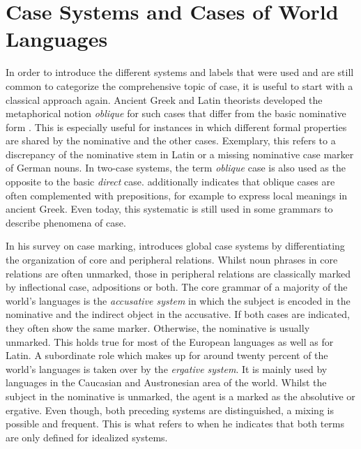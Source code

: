 \documentclass[11pt,a4paper,twoside,openright]{scrbook}
\begin{document}
\section{Case Systems and Cases of World Languages}

In order to introduce the different systems and labels that were used and are still common to categorize the comprehensive topic of case, it is useful to start with a classical approach again. Ancient Greek and Latin theorists developed the metaphorical notion \textit{oblique} for such cases that differ from the basic nominative form \citep{haspelmath2012hbocas}. This is especially useful for instances in which different formal properties are shared by the nominative and the other cases. Exemplary, this refers to a discrepancy of the nominative stem in Latin or a missing nominative case marker of German nouns. In two-case systems, the term \textit{oblique} case is also used as the opposite to the basic \textit{direct} case. \citet{blake2012hbocas} additionally indicates that oblique cases are often  complemented with prepositions, for example to express local meanings in ancient Greek. Even today, this systematic is still used in some grammars to describe phenomena of case.

In his survey on case marking, \citet{blake1994case} introduces global case systems by differentiating the organization of core and peripheral relations. Whilst noun phrases in core relations are often unmarked, those in peripheral relations are classically marked by inflectional case, adpositions or both. The core grammar of a majority of the world's languages is the \textit{accusative system} in which the subject is encoded in the nominative and the indirect object in the accusative. If both cases are indicated, they often show the same marker. Otherwise, the nominative is usually unmarked. This holds true for most of the European languages as well as for Latin. A subordinate role which makes up for around twenty percent of the world's languages is taken over by the \textit{ergative system}. It is mainly used by languages in the Caucasian and Austronesian area of the world. Whilst the subject in the nominative is unmarked, the agent is a marked as the absolutive or ergative. Even though, both preceding systems are distinguished, a mixing is possible and frequent. This is what \citet{haspelmath2012hbocas} refers to when he indicates that both terms are only defined for idealized systems. 
\end{document}
